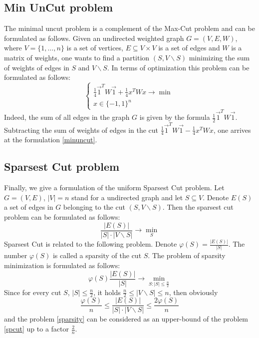 \documentclass[12pt]{article}
\begin{document}
\subsection{Min UnCut problem}

The minimal uncut problem is a complement of the Max-Cut problem and can be 
formulated as follows.
Given an undirected weighted graph $G = (V, E, W)$, where $V = \{1, \dots, n\}$ is a set 
of vertices, $E \subseteq V \times V$ is a set of edges and $W$ is a matrix of weights, 
one wants to find a partition $(S, V\backslash S)$ minimizing the sum of weights of 
edges in $S$ and $V \backslash S$.
In terms of optimization this problem can be formulated as follows:
\begin{equation}
\label{minuncut}
	\begin{cases}
		\frac14 \vec 1^T W \vec 1 + \frac14 x^T W x \longrightarrow \min \\
		x \in \{-1, 1\}^n
	\end{cases}
\end{equation}
Indeed, the sum of all edges in the graph $G$ is given by the formula $\frac12 \vec 1^T W 
\vec 1$. Subtracting the sum of weights of edges in the cut $\frac14 \vec 1^T W \vec 1 - 
\frac14 x^T W x$, one arrives at the formulation \ref{minuncut}.



\subsection{Sparsest Cut problem}

Finally, we give a formulation of the uniform Sparsest Cut problem.
Let $G = (V, E)$, $|V| = n$ stand for a undirected graph and let $S \subseteq V$.
Denote $E(S)$ a set of edges in $G$ belonging to the cut $(S, V \backslash S)$.
Then the sparsest cut problem can be formulated as follows:
\begin{equation}
\label{spcut}
	\frac{ |E(S)| }{ |S| \cdot |V \backslash S| } \rightarrow \min\limits_S
\end{equation}
Sparsest Cut is related to the following problem.
Denote $\varphi(S) = \frac{ |E(S)| }{ |S| }$.
The number $\varphi(S)$ is called a sparsity of the cut $S$.
The problem of sparsity minimization is formulated as follows:
\begin{equation}
\label{sparsity}
	\varphi(S) \frac{ |E(S)| }{ |S| } \longrightarrow \min\limits_{S : |S| \leq \frac n2}
\end{equation}
Since for every cut $S$, $|S| \leq \frac n2$, it holds	$\frac n2 \leq | V \backslash S| \leq 
n$, then obviously
\[
	 \frac{ \varphi(S) }n \leq \frac{ |E(S)| }{ |S| \cdot |V \backslash S| } \leq  \frac{ 
	 2\varphi(S) }n
\]
and the problem \ref{sparsity} can be considered as an upper-bound of the problem 
\ref{spcut} up to a factor $\frac 2n$.
\end{document}
